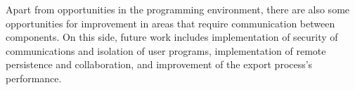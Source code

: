 



Apart from opportunities in the programming environment, there are also some opportunities for improvement in areas that require communication between components.
On this side, future work includes implementation of security of communications and isolation of user programs, implementation of remote persistence and collaboration, and improvement of the export process's performance.

